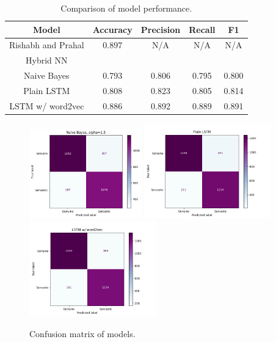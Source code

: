 \documentclass[11pt]{article}
\begin{document}
\begin{table}[tbh]
    \centering
    \begin{tabular}{|c|c|c|c|c|}
        \hline
        Model              & Accuracy & Precision & Recall & F1    \\
        \hline
        Rishabh and Prahal & 0.897    & N/A       & N/A    & N/A   \\
        Hybrid NN          &          &           &        &       \\
        \hline
        Naive Bayes        & 0.793    & 0.806     & 0.795  & 0.800 \\
        \hline
        Plain LSTM         & 0.808    & 0.823     & 0.805  & 0.814 \\
        \hline
        LSTM w/ word2vec   & 0.886    & 0.892     & 0.889  & 0.891 \\
        \hline
    \end{tabular}
    \caption{Comparison of model performance.}
    \label{tab:perf}
\end{table}

\begin{figure}[tbh]
    \centering
    \includegraphics[width=4.86cm]{nb-cm.png}
    \includegraphics[width=5.5cm]{plain_lstm_cm.png}
    \includegraphics[width=5.5cm]{lstm_w2v_cm.png}
    \caption{Confusion matrix of models.}
    \label{fig:cm}
\end{figure}
\end{document}
